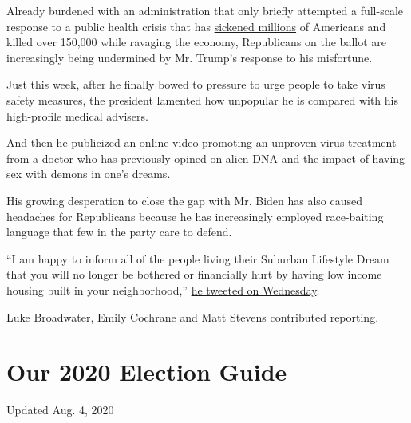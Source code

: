 Already burdened with an administration that only briefly attempted a
full-scale response to a public health crisis that has
\href{https://www.nytimes3xbfgragh.onion/interactive/2020/us/coronavirus-us-cases.html}{sickened
millions} of Americans and killed over 150,000 while ravaging the
economy, Republicans on the ballot are increasingly being undermined by
Mr. Trump's response to his misfortune.

Just this week, after he finally bowed to pressure to urge people to
take virus safety measures, the president lamented how unpopular he is
compared with his high-profile medical advisers.

And then he
\href{https://www.nytimes3xbfgragh.onion/2020/07/28/technology/virus-video-trump.html}{publicized
an online video} promoting an unproven virus treatment from a doctor who
has previously opined on alien DNA and the impact of having sex with
demons in one's dreams.

His growing desperation to close the gap with Mr. Biden has also caused
headaches for Republicans because he has increasingly employed
race-baiting language that few in the party care to defend.

``I am happy to inform all of the people living their Suburban Lifestyle
Dream that you will no longer be bothered or financially hurt by having
low income housing built in your neighborhood,''
\href{https://www.nytimes3xbfgragh.onion/2020/07/29/us/politics/trump-suburbs-housing-white-voters.html}{he
tweeted on Wednesday}.

Luke Broadwater, Emily Cochrane and Matt Stevens contributed reporting.

\hypertarget{our-2020-election-guide}{%
\section{Our 2020 Election Guide}\label{our-2020-election-guide}}

Updated Aug. 4, 2020

